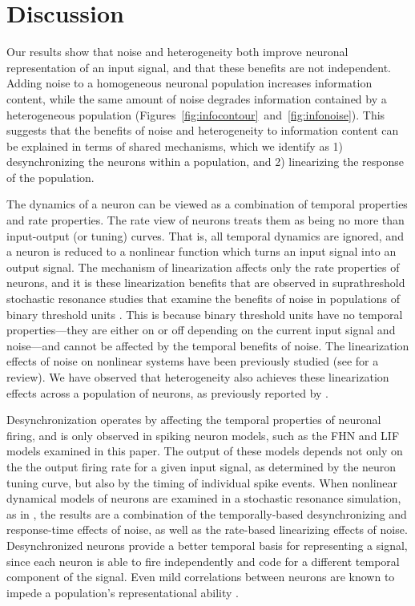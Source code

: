 \documentclass[12pt]{article}
\begin{document}
\section{Discussion}
\label{scn:discussion}

Our results show that noise and heterogeneity both improve neuronal representation of an input signal, and that these benefits are not independent. Adding noise to a homogeneous neuronal population increases information content, while the same amount of noise degrades information contained by a heterogeneous population (Figures~\ref{fig:infocontour}~and~\ref{fig:infonoise}). This suggests that the benefits of noise and heterogeneity to information content can be explained in terms of shared mechanisms, which we identify as 1) desynchronizing the neurons within a population, and 2) linearizing the response of the population.

The dynamics of a neuron can be viewed as a combination of temporal properties and rate properties. The rate view of neurons treats them as being no more than input-output (or tuning) curves. That is, all temporal dynamics are ignored, and a neuron is reduced to a nonlinear function which turns an input signal into an output signal. The mechanism of linearization affects only the rate properties of neurons, and it is these linearization benefits that are observed in suprathreshold stochastic resonance studies that examine the benefits of noise in populations of binary threshold units \citep{Stocks2000,Stocks2001a,McDonnell2006}. This is because binary threshold units have no temporal properties---they are either on or off depending on the current input signal and noise---and cannot be affected by the temporal benefits of noise. The linearization effects of noise on nonlinear systems have been previously studied (see \cite{Stocks1996} for a review). We have observed that heterogeneity also achieves these linearization effects across a population of neurons, as previously reported by \cite{Eliasmith2003}.

Desynchronization operates by affecting the temporal properties of neuronal firing, and is only observed in spiking neuron models, such as the FHN and LIF models examined in this paper. The output of these models depends not only on the the output firing rate for a given input signal, as determined by the neuron tuning curve, but also by the timing of individual spike events. When nonlinear dynamical models of neurons are examined in a stochastic resonance simulation, as in \cite{Stocks2001}, the results are a combination of the temporally-based desynchronizing and response-time effects of noise, as well as the rate-based linearizing effects of noise.  Desynchronized neurons provide a better temporal basis for representing a signal, since each neuron is able to fire independently and code for a different temporal component of the signal. Even mild correlations between neurons are known to impede a population's representational ability \citep{Zohary1994}.
\end{document}
